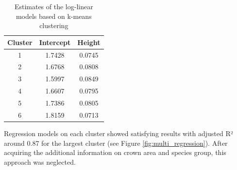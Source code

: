 \begin{table}[H]
\centering
\setlength\arrayrulewidth{1pt}
\begin{adjustbox}{max width=\textwidth}

\begin{tabular}{|c|c|c|}
\hline 
\rowcolor{Gray}
\textbf{Cluster} & \textbf{Intercept} & \textbf{Height} \\ 
\hline 
1 & 1.7428 & 0.0745 \\ 
\hline 
2 & 1.6768 & 0.0808 \\ 
\hline 
3 & 1.5997 & 0.0849 \\ 
\hline 
4 & 1.6607 & 0.0795 \\ 
\hline 
5 & 1.7386 & 0.0805 \\ 
\hline 
6 & 1.8159 & 0.0713 \\ 
\hline 
\end{tabular} 

\end{adjustbox}

\caption{Estimates of the log-linear models based on k-means clustering}
\label{tab:appendix_table}
\end{table}

Regression models on each cluster showed satisfying results with adjusted R² around 0.87 for the largest cluster (see Figure \ref{fig:multi_regression}). After acquiring the additional information on crown area and species group, this approach was neglected. 
